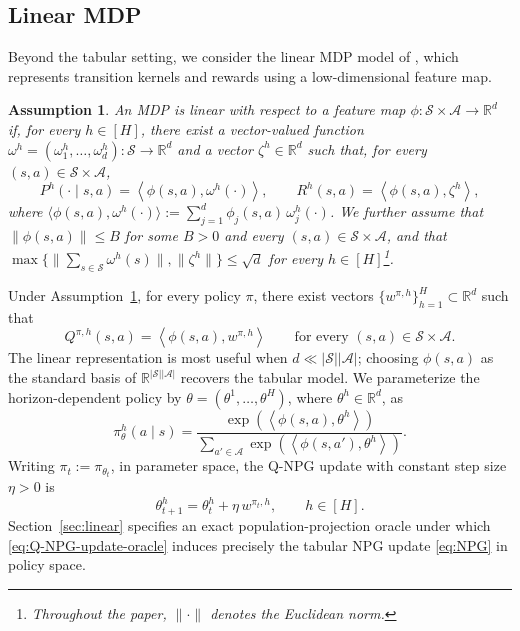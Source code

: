 \documentclass[11pt]{article}
\newtheorem{assum}{Assumption}
\begin{document}
\subsection{Linear MDP}
Beyond the tabular setting, we consider the linear MDP model of
\citet{jin2020provably}, which represents transition kernels and rewards using
a low-dimensional feature map.
\begin{assum}\label{ass:LinMDP}
An MDP is linear with respect to a feature map
$\phi:\mathcal{S}\times\mathcal{A}\to\mathbb{R}^d$ if, for every $h\in[H]$, there exist a vector-valued function
$\omega^h=(\omega_1^h,\ldots,\omega_d^h):\mathcal{S}\to\mathbb{R}^d$
and a vector $\zeta^h\in\mathbb{R}^d$ such that, for every
$(s,a)\in\mathcal{S}\times\mathcal{A}$,
\[
P^h(\cdot\mid s,a)
=
\left\langle\phi(s,a),\omega^h(\cdot)\right\rangle,
\qquad
R^h(s,a)
=
\left\langle\phi(s,a),\zeta^h\right\rangle,
\]
where
$\langle\phi(s,a),\omega^h(\cdot)\rangle:=\sum_{j=1}^d\phi_j(s,a)\,\omega_j^h(\cdot)$.
We further assume that $\|\phi(s,a)\|\le B$ for some $B>0$ and every
$(s,a)\in\mathcal{S}\times\mathcal{A}$, and that
$\max\{\|\sum_{s\in\mathcal{S}}\omega^h(s)\|,\|\zeta^h\|\}\le\sqrt{d}$ for
every $h\in[H]$\footnote{Throughout the paper, $\|\cdot\|$ denotes the
Euclidean norm.}.
\end{assum}
Under Assumption~\ref{ass:LinMDP}, for every policy $\pi$, there exist vectors
$\{w^{\pi,h}\}_{h=1}^H\subset\mathbb{R}^d$ such that
\begin{equation}\label{eq:Q_w}
Q^{\pi,h}(s,a)
=
\left\langle\phi(s,a),w^{\pi,h}\right\rangle
\qquad
\text{for every }(s,a)\in\mathcal{S}\times\mathcal{A}.
\end{equation}
The linear
representation is most useful when $d\ll|\mathcal{S}||\mathcal{A}|$; choosing
$\phi(s,a)$ as the standard basis of $\mathbb{R}^{|\mathcal{S}||\mathcal{A}|}$ recovers the tabular model. We parameterize the horizon-dependent policy by
$\theta=(\theta^1,\ldots,\theta^H)$, where $\theta^h\in\mathbb{R}^d$, as
\begin{equation}\label{eq:policy_parametrization}
\pi_\theta^h(a\mid s)
=
\frac{
\exp\!\left(\left\langle\phi(s,a),\theta^h\right\rangle\right)
}{
\sum_{a'\in\mathcal{A}}
\exp\!\left(\left\langle\phi(s,a'),\theta^h\right\rangle\right)
}.
\end{equation}
Writing $\pi_t:=\pi_{\theta_t}$, in parameter space, the Q-NPG update
\citep{agarwal2021theory} with constant step size $\eta>0$ is
\begin{equation}\label{eq:Q-NPG-update-oracle}
\theta_{t+1}^h
=
\theta_t^h+\eta\, w^{\pi_t,h},
\qquad h\in[H].
\end{equation}
Section~\ref{sec:linear} specifies an exact population-projection oracle under
which \eqref{eq:Q-NPG-update-oracle} induces precisely the tabular NPG update
\eqref{eq:NPG} in policy space.
\end{document}
